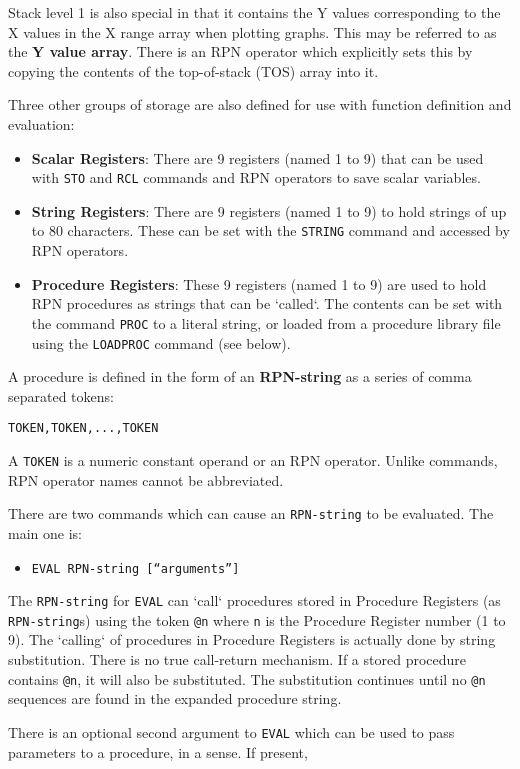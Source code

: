 \documentclass[a4paper,twoside,11pt]{article}
\newcommand{\newpara}{\par\vspace{4mm}\noindent}
\newcommand{\textttc}[1]{\texttt{\textcolor{OurRed}{#1}}}
\begin{document}
\newpara
Stack level 1 is also special in that it contains the Y values corresponding to the X values in the X range array when plotting graphs.
This may be referred to as the \textbf{Y value array}. There is an RPN operator which explicitly sets this by copying the contents of
the top-of-stack (TOS) array into it.
\newpara
Three other groups of storage are also defined for use with function definition and evaluation:
\begin{itemize}
\item \textbf{Scalar Registers}: There are 9 registers (named 1 to 9) that can be used with \texttt{STO} and \texttt{RCL} commands and RPN
	operators to save scalar variables.
\item \textbf{String Registers}: There are 9 registers (named 1 to 9) to hold strings of up to 80 characters. These can be set with the
	\texttt{STRING} command and accessed by RPN operators.
\item \textbf{Procedure Registers}: These 9 registers (named 1 to 9) are used to hold RPN procedures as strings that can be `called`. The
	contents can be set with the command \texttt{PROC} to a literal string, or loaded from a procedure library file using the
	\texttt{LOADPROC} command (see below).
\end{itemize}
\newpara
A procedure is defined in the form of an \textbf{RPN-string} as a series of comma separated tokens:
\begin{verbatim}
TOKEN,TOKEN,...,TOKEN
\end{verbatim}
A \texttt{TOKEN} is a numeric constant operand or an RPN operator. Unlike commands, RPN operator names cannot be abbreviated. 
\newpara
There are two commands which can cause an \texttt{RPN-string} to be evaluated. The main one is:
\begin{itemize}
\item \textttc{EVAL RPN-string [``arguments'']}
\end{itemize}
The \texttt{RPN-string} for \texttt{EVAL} can `call` procedures stored in Procedure Registers (as \texttt{RPN-string}s) using the token
\texttt{@n} where \texttt{n} is the Procedure Register number (1 to 9). The `calling` of procedures in Procedure Registers is
actually done by string substitution. There is no true call-return mechanism. If a stored procedure contains \texttt{@n}, it
will also be substituted. The substitution continues until no \texttt{@n} sequences are found in the expanded procedure
string.
\newpara
There is an optional second argument to \texttt{EVAL} which can be used to pass parameters to a procedure, in a sense. If present,
\end{document}
